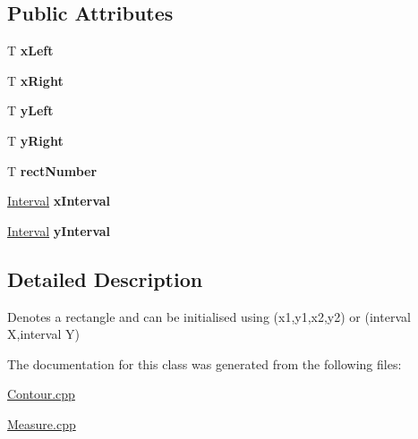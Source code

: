 \subsection*{Public Attributes}
\begin{DoxyCompactItemize}
\item 
\mbox{\label{classRectangle_aa1f4e63072f4b04b27f9824f61550455}} 
T {\bfseries x\+Left}
\item 
\mbox{\label{classRectangle_a1a86ad326e4c680928d5a45535211703}} 
T {\bfseries x\+Right}
\item 
\mbox{\label{classRectangle_a53e549e4a31de48d2e44eb4dc5b65c26}} 
T {\bfseries y\+Left}
\item 
\mbox{\label{classRectangle_ab5aa4b2b4bc16f2f7ee1c6776d734dab}} 
T {\bfseries y\+Right}
\item 
\mbox{\label{classRectangle_a208241bb13b2596f8ff41b53f31b6331}} 
T {\bfseries rect\+Number}
\item 
\mbox{\label{classRectangle_a46752e3fb7782b2c1226cf1e894ca8f3}} 
\hyperlink{classInterval}{Interval} {\bfseries x\+Interval}
\item 
\mbox{\label{classRectangle_a78ca87b2478f720ec6c9aa8b575b6856}} 
\hyperlink{classInterval}{Interval} {\bfseries y\+Interval}
\end{DoxyCompactItemize}


\subsection{Detailed Description}
Denotes a rectangle and can be initialised using (x1,y1,x2,y2) or (interval X,interval Y) 

The documentation for this class was generated from the following files\+:\begin{DoxyCompactItemize}
\item 
\hyperlink{Contour_8cpp}{Contour.\+cpp}\item 
\hyperlink{Measure_8cpp}{Measure.\+cpp}\end{DoxyCompactItemize}
